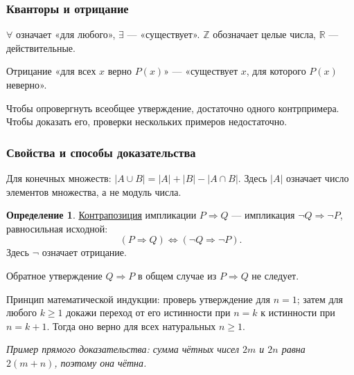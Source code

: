 \documentclass[12pt,a4paper]{article}
\theoremstyle{definition}
\newtheorem{definition}{Определение}[section]
\theoremstyle{plain}
\theoremstyle{remark}
\newcommand{\term}[1]{\uline{#1}}
\begin{document}
\subsubsection*{Кванторы и отрицание}
\(\forall \) означает «для любого», \(\exists \) — «существует». \(\mathbb{Z}\) обозначает целые числа, \(\mathbb{R}\) — действительные.\par
Отрицание «для всех \(x\) верно \(P (x)\)» — «существует \(x\), для которого \(P (x)\) неверно».\par
Чтобы опровергнуть всеобщее утверждение, достаточно одного контрпримера. Чтобы доказать его, проверки нескольких примеров недостаточно.\par
\subsubsection*{Свойства и способы доказательства}
Для конечных множеств: \(| A \cup  B | = | A | + | B | - | A \cap  B |\). Здесь \(| A |\) означает число элементов множества, а не модуль числа.\par
\begin{definition}\term{Контрапозиция} импликации \(P\Rightarrow Q\) — импликация \(\neg Q\Rightarrow\neg P\), равносильная исходной:\[ (P\Rightarrow Q)\Longleftrightarrow(\neg Q\Rightarrow\neg P). \] Здесь \(\neg\) означает отрицание.\end{definition}
Обратное утверждение \(Q\Rightarrow P\) в общем случае из \(P\Rightarrow Q\) не следует.\par
Принцип математической индукции: проверь утверждение для \(n = 1\); затем для любого \(k \ge  1\) докажи переход от его истинности при \(n = k\) к истинности при \(n = k + 1\). Тогда оно верно для всех натуральных \(n \ge  1\).\par
{\small\textit{Пример прямого доказательства: сумма чётных чисел \(2 m\) и \(2 n\) равна \(2 (m + n)\), поэтому она чётна.}}\par
\end{document}
